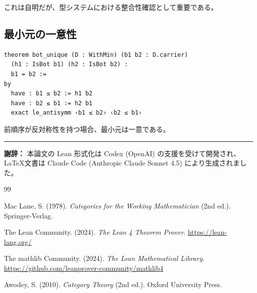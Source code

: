 \documentclass[a4paper,12pt]{ltjsarticle}
\theoremstyle{definition}
\begin{document}
これは自明だが、型システムにおける整合性確認として重要である。

\subsection{最小元の一意性}

\begin{verbatim}
theorem bot_unique (D : WithMin) (b1 b2 : D.carrier)
  (h1 : IsBot b1) (h2 : IsBot b2) :
  b1 = b2 :=
by
  have : b1 ≤ b2 := h1 b2
  have : b2 ≤ b1 := h2 b1
  exact le_antisymm ‹b1 ≤ b2› ‹b2 ≤ b1›
\end{verbatim}

前順序が反対称性を持つ場合、最小元は一意である。


\vspace{2em}
\begin{center}
\rule{0.5\textwidth}{0.4pt}
\end{center}

\noindent
\textbf{謝辞：}
本論文の Lean 形式化は Codex (OpenAI) の支援を受けて開発され、
\LaTeX 文書は Claude Code (Anthropic Claude Sonnet 4.5) により生成されました。


\begin{thebibliography}{99}

Mac Lane, S. (1978). \textit{Categories for the Working Mathematician} (2nd ed.).
Springer-Verlag.

The Lean Community. (2024). \textit{The Lean 4 Theorem Prover}.
\url{https://lean-lang.org/}

The mathlib Community. (2024). \textit{The Lean Mathematical Library}.
\url{https://github.com/leanprover-community/mathlib4}

Awodey, S. (2010). \textit{Category Theory} (2nd ed.).
Oxford University Press.

\end{thebibliography}
\end{document}
